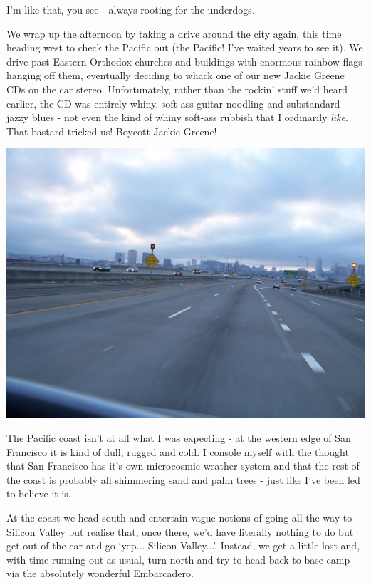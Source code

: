 \documentclass[a5paper,titlepage,11pt]{book}
\begin{document}
I'm like that, you see - always rooting for the underdogs.

We wrap up the afternoon by taking a drive around the city again, this time heading west to check the Pacific out (the Pacific! I've waited years to see it). We drive past Eastern Orthodox churches and buildings with enormous rainbow flags hanging off them, eventually deciding to whack one of our new Jackie Greene CDs on the car stereo. Unfortunately, rather than the rockin' stuff we'd heard earlier, the CD was entirely whiny, soft-ass guitar noodling and substandard jazzy blues - not even the kind of whiny soft-ass rubbish that I ordinarily \emph{like}. That bastard tricked us!  Boycott Jackie Greene!

\begin{center}\includegraphics[width=\textwidth]{gfx/100_1076}\end{center}

The Pacific coast isn't at all what I was expecting - at the western edge of San Francisco it is kind of dull, rugged and cold. I console myself with the thought that San Francisco has it's own microcosmic weather system and that the rest of the coast is probably all shimmering sand and palm trees - just like I've been led to believe it is.

At the coast we head south and entertain vague notions of going all the way to Silicon Valley but realise that, once there, we'd have literally nothing to do but get out of the car and go `yep... Silicon Valley...'. Instead, we get a little lost and, with time running out as usual, turn north and try to head back to base camp via the absolutely wonderful Embarcadero.
\end{document}
